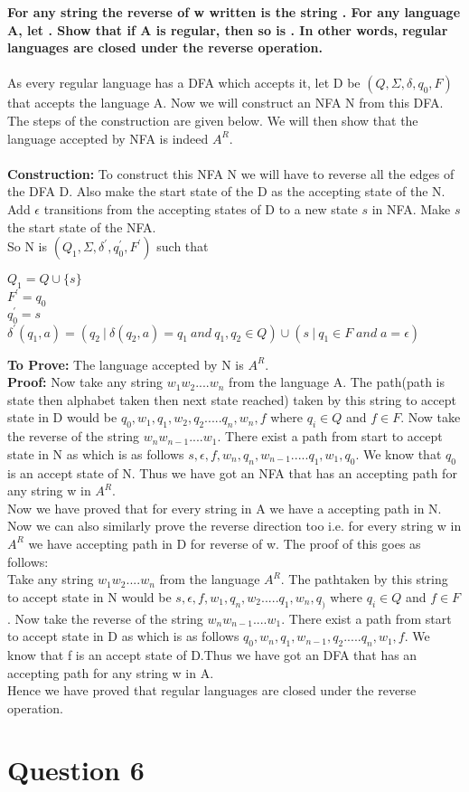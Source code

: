 \documentclass{article}
\begin{document}
\textbf{For any string  the reverse of w written  is the string 
. For any language A, let . Show that if A is regular,
 then so is . In other words, regular languages are closed under the reverse operation.}\\
\\
As every regular language has a DFA which accepts it, let D be $(Q, \Sigma, \delta, q_0, F )$ that accepts the language
 A. Now we will construct an NFA N from this DFA. The steps of the construction are given below. We will then show that 
 the language accepted by NFA is indeed $A^R$.\\
\\
\textbf{Construction:} To construct this NFA N we will have to reverse all the edges of the DFA D. Also make the start 
state of the D as the accepting state of the N. Add $\epsilon$ transitions from the accepting states of D to a new state 
$s$ in NFA. Make $s$ the start state of the NFA.\\
So N is $(Q_1, \Sigma, \delta^{'}, q_0^{'} , F^{'} )$ such that
\begin{center}
$Q_1=Q\cup\{s\}$\\
$F^{'}=q_0$\\
$q_0^{'}=s$ \\
$\delta^{'}(q_1,a) = (q_2 \: | \: \delta(q_2,a)=q_1 \: and \: q_1,q_2 \in Q) \cup(s \: |\: q_1\in F\; and \; a=\epsilon)$  
\end{center}
\textbf{To Prove:} The language accepted by N is $A^R$.\\
\textbf{Proof:} Now take any string $w_1 w_2....w_n$ from the language A. The path(path is state then alphabet taken then
 next state reached) taken by this string to accept state in D would be $q_0,w_1,q_1,w_2,q_2.....q_n,w_n,f$ where $q_i\in
  Q$ and $f\in F$. Now take the reverse of the string $w_n w_{n-1}....w_1$. There exist a path from start to accept state 
  in N as which is as follows $s,\epsilon,f,w_n,q_n,w_{n-1}.....q_1,w_1,q_0$. We know that $q_0$ is an accept state of N.
  Thus we have got an NFA that has an accepting path for any string w in $A^R$.\\
Now we have proved that for every string in A we have a accepting path in N. Now we can also similarly prove the reverse 
direction too i.e. for every string w in $A^R$ we have accepting path in D for reverse of w. The proof of this goes as 
follows:\\ Take any string $w_1 w_2....w_n$ from the language $A^R$. The pathtaken by this string to accept state in N 
would be $s,\epsilon,f,w_1,q_n,w_2.....q_1,w_n,q_)$ where $q_i\in Q$ and $f\in F$. Now take the reverse of the string $w_n 
w_{n-1}....w_1$. There exist a path from start to accept state in D as which is as follows $q_0,w_n,q_1,w_{n-1},q_2.....q_n,w_1,
f$. We know that f is an accept state of D.Thus we have got an DFA that has an accepting path for any string w in A.\\
Hence we have proved that regular languages are closed under the reverse operation. 


\pagebreak
\section{Question 6}
\end{document}
